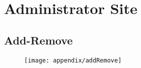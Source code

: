 \chapter{Administrator Site}
\section{Add-Remove}\label{app:addremove}
\begin{figure}[h]
	\centering
	\texttt{[image: appendix/addRemove]}
\end{figure}


